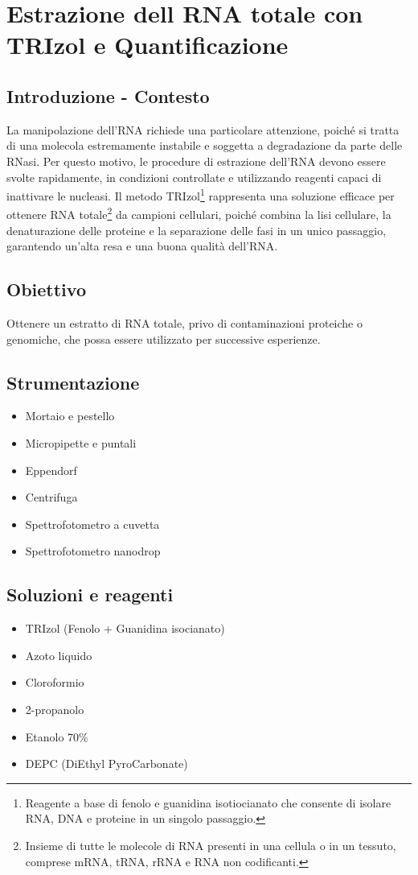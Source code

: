 \section {Estrazione dell RNA totale con TRIzol e Quantificazione}

\subsection{Introduzione - Contesto}
La manipolazione dell’RNA richiede una particolare attenzione, poiché si tratta di una molecola estremamente instabile e soggetta a degradazione da parte delle RNasi. Per questo motivo, le procedure di estrazione dell’RNA devono essere svolte rapidamente, in condizioni controllate e utilizzando reagenti capaci di inattivare le nucleasi. Il metodo TRIzol\footnote{Reagente a base di fenolo e guanidina isotiocianato che consente di isolare RNA, DNA e proteine in un singolo passaggio.} rappresenta una soluzione efficace per ottenere RNA totale\footnote{Insieme di tutte le molecole di RNA presenti in una cellula o in un tessuto, comprese mRNA, tRNA, rRNA e RNA non codificanti.} da campioni cellulari, poiché combina la lisi cellulare, la denaturazione delle proteine e la separazione delle fasi in un unico passaggio, garantendo un’alta resa e una buona qualità dell’RNA.


\subsection{Obiettivo}
Ottenere un estratto di RNA totale, privo di contaminazioni proteiche o genomiche, che possa essere utilizzato per successive esperienze.

\subsection{Strumentazione}
\begin{itemize}
  \item Mortaio e pestello
  \item Micropipette e puntali
  \item Eppendorf
  \item Centrifuga
  \item Spettrofotometro a cuvetta
  \item Spettrofotometro nanodrop
\end{itemize}

\subsection{Soluzioni e reagenti}
\begin{itemize}
  \item TRIzol (Fenolo + Guanidina isocianato)
  \item Azoto liquido
  \item Cloroformio
  \item 2-propanolo
  \item Etanolo 70\%
  \item DEPC (DiEthyl PyroCarbonate)
\end{itemize}

